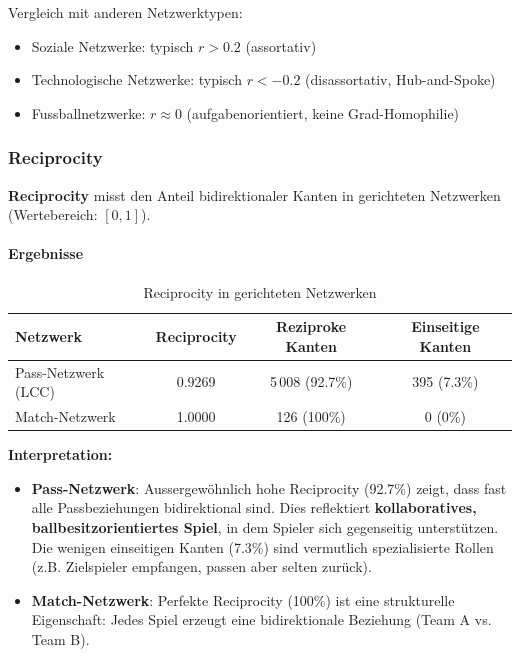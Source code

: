 Vergleich mit anderen Netzwerktypen:
\begin{itemize}
  \item Soziale Netzwerke: typisch $r > 0.2$ (assortativ)
  \item Technologische Netzwerke: typisch $r < -0.2$ (disassortativ, Hub-and-Spoke)
  \item Fussballnetzwerke: $r \approx 0$ (aufgabenorientiert, keine Grad-Homophilie)
\end{itemize}

\subsubsection{Reciprocity}

\textbf{Reciprocity} misst den Anteil bidirektionaler Kanten in gerichteten Netzwerken (Wertebereich: $[0, 1]$).

\paragraph{Ergebnisse}

\begin{table}[h]
\centering
\caption{Reciprocity in gerichteten Netzwerken}
\label{tab:reciprocity}
\begin{tabular}{lccc}
\toprule
\textbf{Netzwerk} & \textbf{Reciprocity} & \textbf{Reziproke Kanten} & \textbf{Einseitige Kanten} \\
\midrule
Pass-Netzwerk (LCC) & 0.9269 & 5\,008 (92.7\%) & 395 (7.3\%) \\
Match-Netzwerk & 1.0000 & 126 (100\%) & 0 (0\%) \\
\bottomrule
\end{tabular}
\end{table}

\textbf{Interpretation:}
\begin{itemize}
  \item \textbf{Pass-Netzwerk}: Aussergewöhnlich hohe Reciprocity (92.7\%) zeigt, dass fast alle Passbeziehungen bidirektional sind. Dies reflektiert \textbf{kollaboratives, ballbesitzorientiertes Spiel}, in dem Spieler sich gegenseitig unterstützen. Die wenigen einseitigen Kanten (7.3\%) sind vermutlich spezialisierte Rollen (z.B. Zielspieler empfangen, passen aber selten zurück).
  \item \textbf{Match-Netzwerk}: Perfekte Reciprocity (100\%) ist eine strukturelle Eigenschaft: Jedes Spiel erzeugt eine bidirektionale Beziehung (Team A vs. Team B).
\end{itemize}

